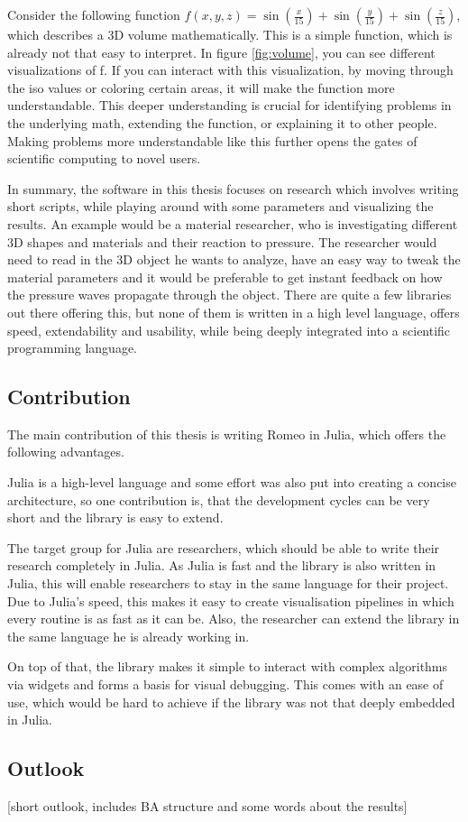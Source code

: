 Consider the following function $f(x,y,z)=\sin(\frac{x}{15})+\sin(\frac{y}{15})+\sin(\frac{z}{15})$, which describes a 3D volume mathematically. 
This is a simple function, which is already not that easy to interpret. In figure \ref{fig:volume}, you can see different visualizations of f.
If you can interact with this visualization, by moving through the iso values or coloring certain areas, it will make the function more understandable.
This deeper understanding is crucial for identifying problems in the underlying math, extending the function, or explaining it to other people. Making problems more understandable like this further opens the gates of scientific computing to novel users.

In summary, the software in this thesis focuses on research which involves writing short scripts, while playing around with some parameters and visualizing the results.
An example would be a material researcher, who is investigating different 3D shapes and materials and their reaction to pressure.
The researcher would need to read in the 3D object he wants to analyze, have an easy way to tweak the material parameters and it would be preferable to get instant feedback on how the pressure waves propagate through the object.
There are quite a few libraries out there offering this, but none of them is written in a high level language, offers speed, extendability and usability, while being deeply integrated into a scientific programming language.

\subsection{Contribution}
The main contribution of this thesis is writing Romeo in Julia, which offers the following advantages.

Julia is a high-level language and some effort was also put into creating a concise architecture, so one contribution is, that the development cycles can be very short and the library is easy to extend.

The target group for Julia are researchers, which should be able to write their research completely in Julia.
As Julia is fast and the library is also written in Julia, this will enable researchers to stay in the same language for their project. Due to Julia's speed, this makes it easy to create visualisation pipelines in which every routine is as fast as it can be. Also, the researcher can extend the library in the same language he is already working in.

On top of that, the library makes it simple to interact with complex algorithms via widgets and forms a basis for visual debugging. This comes with an ease of use, which would be hard to achieve if the library was not that deeply embedded in Julia.


\subsection{Outlook}
[short outlook, includes BA structure and some words about the results]